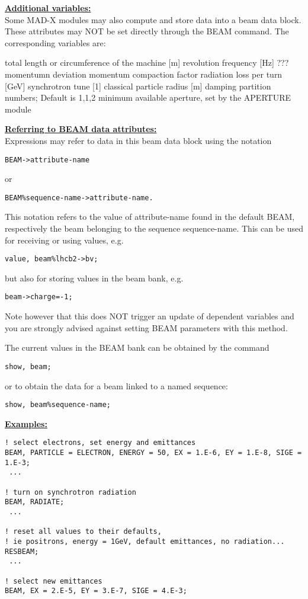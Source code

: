 {\bf \underline{Additional variables:}}\\ 
Some MAD-X modules may also compute and store data into a beam data 
block. These attributes may NOT be set directly through the BEAM
command. The corresponding variables are:  
\begin{madlist}
   total length or circumference of the machine [m]
   revolution frequency [Hz]
   ???
   momentumn deviation
   momentum compaction factor
   radiation loss per turn [GeV]
   synchrotron tune [1]
   classical particle radius [m]
   damping partition numbers; Default is {1,1,2}
   minimum available aperture, set by the APERTURE module
\end{madlist}


{\bf \underline{Referring to BEAM data attributes:}}\\ 
Expressions may refer to data in this beam data block using the
notation  
\begin{verbatim}
BEAM->attribute-name
\end{verbatim} 
or 
\begin{verbatim}
BEAM%sequence-name->attribute-name.
\end{verbatim} 

This notation refers to the value of attribute-name found in the default
BEAM, respectively the beam belonging to the sequence sequence-name. 
This can be used for receiving or using values, e.g. 
\begin{verbatim}
value, beam%lhcb2->bv;
\end{verbatim} 
but also for storing values in the beam bank, e.g.  
\begin{verbatim}
beam->charge=-1;
\end{verbatim} 
Note however that this does NOT trigger an update of dependent variables
and you are strongly advised against setting BEAM parameters with this method.

The current values in the BEAM bank can be obtained by the command
\begin{verbatim}
show, beam;
\end{verbatim}
or to obtain the data for a beam linked to a named sequence:
\begin{verbatim}
show, beam%sequence-name;
\end{verbatim}

{\bf \underline{Examples:}}\\ 
\begin{verbatim}
! select electrons, set energy and emittances
BEAM, PARTICLE = ELECTRON, ENERGY = 50, EX = 1.E-6, EY = 1.E-8, SIGE = 1.E-3;
 ...

! turn on synchrotron radiation
BEAM, RADIATE;
 ...

! reset all values to their defaults, 
! ie positrons, energy = 1GeV, default emittances, no radiation...
RESBEAM;
 ...

! select new emittances
BEAM, EX = 2.E-5, EY = 3.E-7, SIGE = 4.E-3;
\end{verbatim} 


